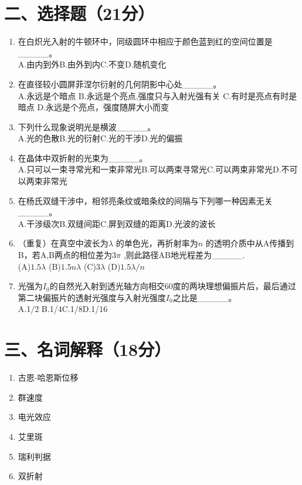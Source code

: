 \documentclass[12pt, a4paper]{article}
\theoremstyle{solution}
\begin{document}
\section*{二、选择题（21分）}
\begin{enumerate}
    \item 在白炽光入射的牛顿环中，同级圆环中相应于颜色蓝到红的空间位置是\_\_\_\_\_。 \\
    A.由内到外\quad B.由外到内\quad C.不变\quad D.随机变化
    \item 在直径较小圆屏菲涅尔衍射的几何阴影中心处\_\_\_\_\_。\\
    A.永远是个暗点 \quad B.永远是个亮点,强度只与入射光强有关 \quad C.有时是亮点有时是暗点 \quad D.永远是个亮点，强度随屏大小而变
    \item 下列什么现象说明光是横波\_\_\_\_\_。\\
    A.光的色散\quad B.光的衍射\quad C.光的干涉\quad D.光的偏振
    \item 在晶体中双折射的光束为\_\_\_\_\_。\\
    A.只可以一束寻常光和一束非常光\quad B.可以两束寻常光\quad C.可以两束非常光\quad D.不可以两束非常光
    \item 在杨氏双缝干涉中，相邻亮条纹或暗条纹的间隔与下列哪一种因素无关\_\_\_\_\_。\\
    A.干涉级次\quad B.双缝间距\quad C.屏到双缝的距离\quad D.光波的波长
    \item （重复）在真空中波长为\(\lambda\) 的单色光，再折射率为$n$ 的透明介质中从A传播到B，若A,B两点的相位差为3\(\pi\) ,则此路径AB地光程差为\_\_\_\_\_.\\(A)$1.5\lambda$ \qquad(B)$1.5n\lambda$ \qquad(C)$3\lambda$ \qquad(D)$1.5\lambda/n$
    \item 光强为$I_0$的自然光入射到透光轴方向相交60度的两块理想偏振片后，最后通过第二块偏振片的透射光强度与入射光强度$I_0$之比是\_\_\_\_\_。\\
    A.1/2 \quad B.1/4\quad C.1/8\quad D.1/16
\end{enumerate}
\section*{三、名词解释（18分）}
\begin{enumerate}
    \item 古恩-哈恩斯位移
    \item 群速度
    \item 电光效应
    \item 艾里斑
    \item 瑞利判据
    \item 双折射
\end{enumerate}
\end{document}
